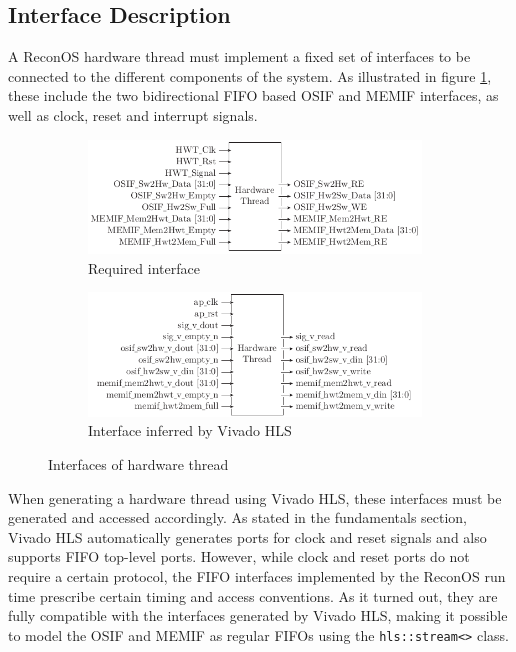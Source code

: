 \subsection{Interface Description}
A ReconOS hardware thread must implement a fixed set of interfaces to be
connected to the different components of the system. As illustrated in figure
\ref{fig:hwt_if_o}, these include the two bidirectional \ac{FIFO} based
\ac{OSIF} and \ac{MEMIF} interfaces, as well as clock, reset and interrupt
signals.
\begin{figure}
	\centering
	\begin{subfigure}{0.49\textwidth}
		\centering
		\includegraphics[width=0.97\textwidth]{../figures/hwt_if_o}
		\caption{Required interface}
		\label{fig:hwt_if_o}
	\end{subfigure}
	\begin{subfigure}{0.49\textwidth}
		\centering
		\includegraphics[width=0.97\textwidth]{../figures/hwt_if_h}
		\caption{Interface inferred by Vivado HLS}
		\label{fig:hwt_if_h}
	\end{subfigure}
	\caption{Interfaces of hardware thread}
	\label{fig:hwt_if}
\end{figure}
When generating a hardware thread using Vivado HLS, these interfaces must be
generated and accessed accordingly. As stated in the fundamentals section,
Vivado HLS automatically generates ports for clock and reset signals and also
supports \ac{FIFO} top-level ports. However, while clock and reset ports do
not require a certain protocol, the \ac{FIFO} interfaces implemented by the
ReconOS run time prescribe certain timing and access conventions. As it turned
out, they are fully compatible with the interfaces generated by Vivado HLS,
making it possible to model the \ac{OSIF} and \ac{MEMIF} as regular \acp{FIFO}
using the \lstinline{hls::stream<>} class.


